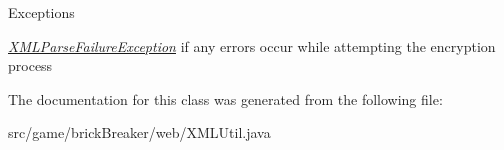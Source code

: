 \begin{DoxyExceptions}{Exceptions}
\item[{\em \hyperlink{classbrick_breaker_1_1web_1_1_x_m_l_parse_failure_exception}{XMLParseFailureException}}]if any errors occur while attempting the encryption process \end{DoxyExceptions}


The documentation for this class was generated from the following file:\begin{DoxyCompactItemize}
\item 
src/game/brickBreaker/web/XMLUtil.java\end{DoxyCompactItemize}
